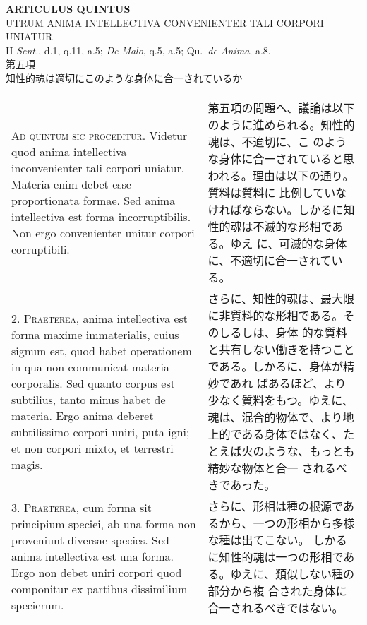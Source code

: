 \documentclass[paper=a4paper,fontsize=10pt,jafontsize=9pt,titlepage]{jlreq}
\begin{document}
\newpage
{}
\begin{center}
{\Large {\bfseries ARTICULUS QUINTUS}}\\
{\large UTRUM ANIMA INTELLECTIVA CONVENIENTER TALI CORPORI UNIATUR}\\
{\footnotesize II {\itshape Sent.}, d.1, q.11, a.5; {\itshape De Malo}, q.5, a.5; Qu.~{\itshape de Anima}, a.8.}\\
{\Large 第五項\\知性的魂は適切にこのような身体に合一されているか}
\end{center}

\begin{longtable}{p{21em}p{21em}}
 {\scshape Ad quintum sic proceditur}. Videtur quod anima intellectiva
 inconvenienter tali corpori uniatur. Materia enim debet esse
 proportionata formae. Sed anima intellectiva est forma
 incorruptibilis. Non ergo convenienter unitur corpori corruptibili.
 
&

第五項の問題へ、議論は以下のように進められる。知性的魂は、不適切に、こ
のような身体に合一されていると思われる。理由は以下の通り。質料は質料に
比例していなければならない。しかるに知性的魂は不滅的な形相である。ゆえ
に、可滅的な身体に、不適切に合一されている。
 
\\


 2. {\scshape Praeterea}, anima intellectiva est forma maxime
 immaterialis, cuius signum est, quod habet operationem in qua non
 communicat materia corporalis. Sed quanto corpus est subtilius, tanto
 minus habet de materia. Ergo anima deberet subtilissimo corpori
 uniri, puta igni; et non corpori mixto, et terrestri magis.
 
&

 さらに、知性的魂は、最大限に非質料的な形相である。そのしるしは、身体
 的な質料と共有しない働きを持つことである。しかるに、身体が精妙であれ
 ばあるほど、より少なく質料をもつ。ゆえに、魂は、混合的物体で、より地
 上的である身体ではなく、たとえば火のような、もっとも精妙な物体と合一
 されるべきであった。
\\




3. {\scshape Praeterea}, cum forma sit principium speciei, ab una
forma non proveniunt diversae species. Sed anima intellectiva est una
forma. Ergo non debet uniri corpori quod componitur ex partibus
dissimilium specierum.
 
&

 さらに、形相は種の根源であるから、一つの形相から多様な種は出てこない。
 しかるに知性的魂は一つの形相である。ゆえに、類似しない種の部分から複
 合された身体に合一されるべきではない。
\\





\end{longtable}
\end{document}
